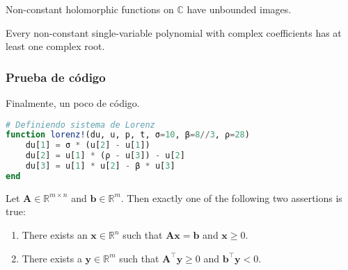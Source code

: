 \begin{coro}{}{}
	Non-constant holomorphic functions on $\mathbb{C}$  have unbounded 
	images.
\end{coro}

\begin{coro}{}{}
	Every non-constant single-variable polynomial with complex 
	coefficients has at least one complex root.
\end{coro}

\subsubsection{Prueba de código}
Finalmente, un poco de código.

\begin{lstlisting}[language=julia, caption=Aplicando algoritmo de cifrado]
# Definiendo sistema de Lorenz
function lorenz!(du, u, p, t, σ=10, β=8//3, ρ=28)
    du[1] = σ * (u[2] - u[1])
    du[2] = u[1] * (ρ - u[3]) - u[2]
    du[3] = u[1] * u[2] - β * u[3]
end
\end{lstlisting}

\lipsum[3][1-3]

\begin{lemma}{}{}
	Let $\displaystyle \mathbf{A} \in \mathbb{R}^{m\times n}$ and 
	$\displaystyle \mathbf{b} \in \mathbb {R}^{m}$. Then exactly one 
	of the following two assertions is true:
	\begin{enumerate}
		\item There exists an $\displaystyle \mathbf{x} \in \mathbb 
			{R} ^{n}$ such that $\mathbf{Ax} =\mathbf{b}$ and 
			$\displaystyle \mathbf{x} \geq 0$.
		\item There exists a $\displaystyle \mathbf{y} \in \mathbb
			{R}^{m}$ such that $\displaystyle 
			\mathbf{A}^{\top}\mathbf{y} \geq 0$ and $\displaystyle 
			\mathbf{b}^{\top}\mathbf{y} <0$.
	\end{enumerate}
\end{lemma}

